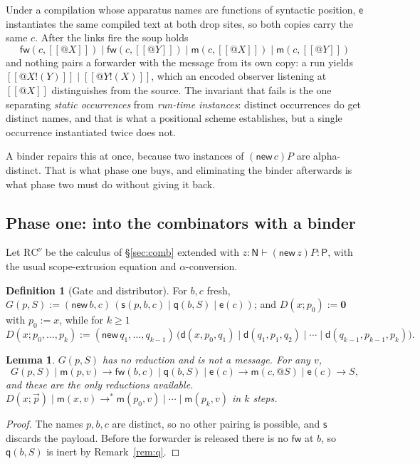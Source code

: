 \documentclass[11pt]{article}
\makeatletter
\theoremstyle{plain}
\newtheorem{lemma}[theorem]{Lemma}
\theoremstyle{definition}
\newtheorem{definition}[theorem]{Definition}
\theoremstyle{remark}
\newcommand{\quo}[1]{@#1}
\newcommand{\out}[2]{#1!(#2)}
\newcommand{\nil}{\mathbf{0}}
\newcommand{\enc}[1]{[\![#1]\!]}
\newcommand{\mm}{\mathsf{m}}
\newcommand{\dd}{\mathsf{d}}
\newcommand{\fw}{\mathsf{fw}}
\newcommand{\sy}{\mathsf{s}}
\newcommand{\ev}{\mathsf{e}}
\newcommand{\qq}{\mathsf{q}}
\newcommand{\red}{\longrightarrow}
\newcommand{\wred}{\longrightarrow^{*}}
\makeatother
\begin{document}
Under a compilation whose apparatus names are functions of syntactic
position, $\ev$ instantiates the same compiled text at both drop sites, so
both copies carry the same $c$. After the links fire the soup holds
\[
  \fw(c,\enc{\quo{X}}) \mid \fw(c,\enc{\quo{Y}}) \mid
  \mm(c,\enc{\quo{X}}) \mid \mm(c,\enc{\quo{Y}})
\]
and nothing pairs a forwarder with the message from its own copy: a run
yields $\enc{\out{\quo{X}}{Y}} \mid \enc{\out{\quo{Y}}{X}}$, which an encoded
observer listening at $\enc{\quo{X}}$ distinguishes from the source. The
invariant that fails is the one separating \emph{static occurrences} from
\emph{run-time instances}: distinct occurrences do get distinct names, and
that is what a positional scheme establishes, but a single occurrence
instantiated twice does not.

A binder repairs this at once, because two instances of $(\mathsf{new}\,c)P$
are alpha-distinct. That is what phase one buys, and eliminating the binder
afterwards is what phase two must do without giving it back.

\subsection{Phase one: into the combinators with a binder}
\label{sec:phase1}

Let $\mathrm{RC}^{\nu}$ be the calculus of \S\ref{sec:comb} extended with
$z : \mathsf{N} \vdash (\mathsf{new}\,z)P : \mathsf{P}$, with the usual
scope-extrusion equation and $\alpha$-conversion.

\begin{definition}[Gate and distributor]
For $b,c$ fresh, $G(p,S) := (\mathsf{new}\,b,c)\,
(\sy(p,b,c) \mid \qq(b,S) \mid \ev(c))$; and $D(x;p_{0}) := \nil$ with
$p_{0} := x$, while for $k \geq 1$
\[
  D(x;p_{0},\dots,p_{k}) := (\mathsf{new}\,q_{1},\dots,q_{k-1})\,
  \big(\dd(x,p_{0},q_{1}) \mid \dd(q_{1},p_{1},q_{2}) \mid \cdots \mid
  \dd(q_{k-1},p_{k-1},p_{k})\big).
\]
\end{definition}

\begin{lemma}
\label{lem:gate}
$G(p,S)$ has no reduction and is not a message. For any $v$,
\[
  G(p,S) \mid \mm(p,v) \red \fw(b,c) \mid \qq(b,S) \mid \ev(c)
  \red \mm(c,\quo{S}) \mid \ev(c) \red S,
\]
and these are the only reductions available.
$D(x;\vec p) \mid \mm(x,v) \wred \mm(p_{0},v) \mid \cdots \mid \mm(p_{k},v)$
in $k$ steps.
\end{lemma}

\begin{proof}
The names $p,b,c$ are distinct, so no other pairing is possible, and $\sy$
discards the payload. Before the forwarder is released there is no $\fw$ at
$b$, so $\qq(b,S)$ is inert by Remark~\ref{rem:q}.
\end{proof}
\end{document}
